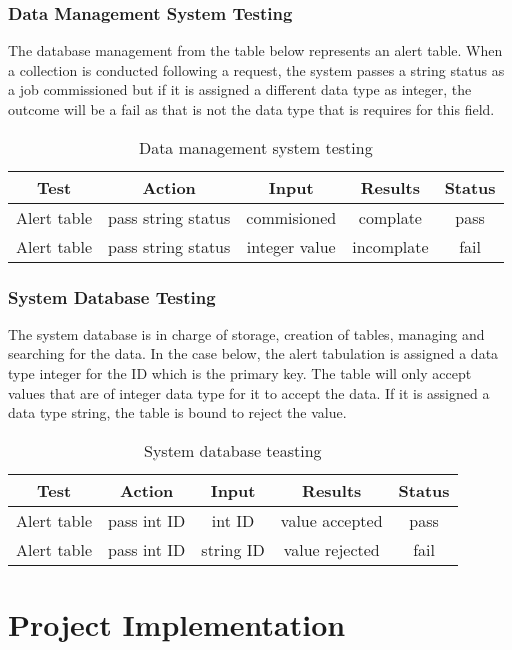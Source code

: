 \documentclass{article}
\begin{document}
\subsubsection{Data Management System Testing}
The database management from the table below represents an alert table. When a collection is conducted following a request, the system passes a string status as a job commissioned but if it is assigned a different data type as integer, the outcome will be a fail as that is not the data type that is requires for this field.
\begin{table}[ht]
\centering
\caption{Data management system testing}
\begin{tabular}{|c|c|c|c|c|}
\hline
Test & Action & Input & Results & Status \\
\hline
\hline
Alert table & pass string status &  commisioned & complate & pass\\
Alert table & pass string status &  integer value & incomplate & fail\\
\end{tabular}

\end{table}
\newpage
\subsubsection{System Database Testing}
The system database is in charge of storage, creation of tables, managing and searching for the data. In the case below, the alert tabulation is assigned a data type integer for the ID which is the primary key. The table will only accept values that are of integer data type for it to accept the data. If it is assigned a data type string, the table is bound to reject the value.
\begin{table}[ht]
\centering
\caption{System database teasting}
\begin{tabular}{|c|c|c|c|c|}
\hline
Test & Action & Input & Results & Status \\
\hline
\hline
Alert table & pass int ID &  int ID & value accepted & pass\\
Alert table & pass int ID &  string  ID & value rejected & fail\\

\end{tabular}

\end{table}
\newpage
\section{Project Implementation}
\end{document}
